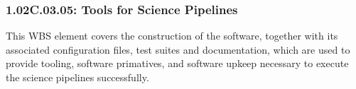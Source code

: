 \subsubsection{1.02C.03.05: Tools for Science Pipelines}

This WBS element covers the construction of the software, together with its
associated configuration files, test suites and documentation, which are used
to provide tooling, software primatives, and software upkeep necessary to execute
the science pipelines successfully.
